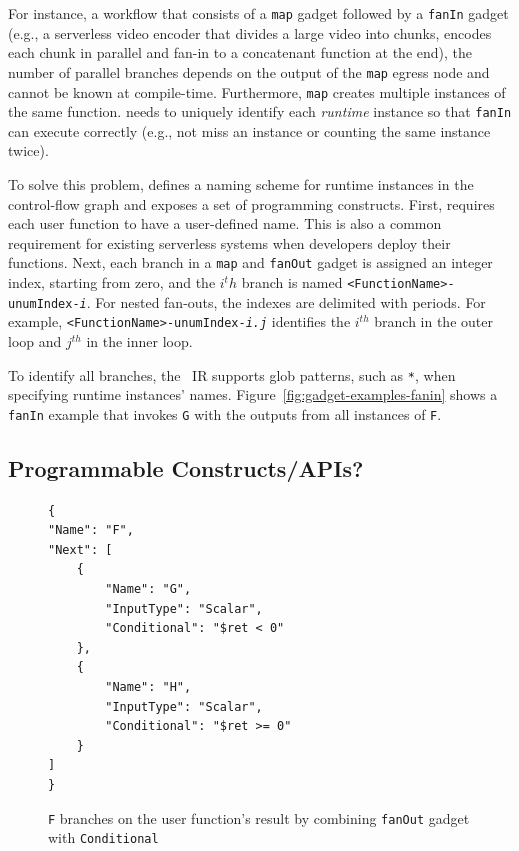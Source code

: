 For instance, a workflow that consists of a \texttt{map} gadget followed by a
\texttt{fanIn} gadget (e.g., a serverless video encoder that divides a large
video into chunks, encodes each chunk in parallel and fan-in to a concatenant
function at the end), the number of parallel branches depends on the output of
the \texttt{map} egress node and cannot be known at compile-time. Furthermore,
\texttt{map} creates multiple instances of the same function. \name{} needs to
uniquely identify each \emph{runtime} instance so that \texttt{fanIn} can
execute correctly (e.g., not miss an instance or counting the same instance
twice).

To solve this problem, \name{} defines a naming scheme for runtime instances
in the control-flow graph and exposes a set of programming constructs. First,
\name{} requires each user function to have a user-defined name. This is also
a common requirement for existing serverless systems when developers deploy
their functions. Next, each branch in a \texttt{map} and \texttt{fanOut}
gadget is assigned an integer index, starting from zero, and the $i^th$ branch
is named \texttt{<FunctionName>-unumIndex-\emph{i}}. For nested fan-outs, the
indexes are delimited with periods. For example,
\texttt{<FunctionName>-unumIndex-\emph{i.j}} identifies the $i^{th}$ branch in
the outer loop and $j^{th}$ in the inner loop.

To identify all branches, the \name{}~IR supports glob patterns, such as
\texttt{*}, when specifying runtime instances' names.
Figure~\ref{fig:gadget-examples-fanin} shows a \texttt{fanIn} example that
invokes \texttt{G} with the outputs from all instances of \texttt{F}.

\subsection{Programmable Constructs/APIs?}

\begin{figure}[]
    \begin{verbatim}
{
"Name": "F",
"Next": [
    {
        "Name": "G",
        "InputType": "Scalar",
        "Conditional": "$ret < 0"
    },
    {
        "Name": "H",
        "InputType": "Scalar",
        "Conditional": "$ret >= 0"
    }
]
}
    \end{verbatim}
    \caption{\texttt{F} branches on the user function's result by
    combining \texttt{fanOut} gadget with \texttt{Conditional}}
    \label{fig:gadget-examples-branch}
\end{figure}

